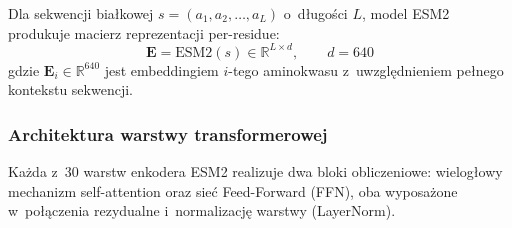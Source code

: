 \documentclass{SGGW-thesis}
\begin{document}
Dla sekwencji białkowej $s = (a_1, a_2, \ldots, a_L)$ o~długości $L$, model ESM2 produkuje macierz
reprezentacji per-residue:
\begin{equation}
    \mathbf{E} = \text{ESM2}(s) \in \mathbb{R}^{L \times d}, \qquad d = 640
    \label{eq:esm2_output}
\end{equation}
gdzie $\mathbf{E}_i \in \mathbb{R}^{640}$ jest embeddingiem $i$-tego aminokwasu z~uwzględnieniem
pełnego kontekstu sekwencji.

\subsubsection*{Architektura warstwy transformerowej}

Każda z~30 warstw enkodera ESM2 realizuje dwa bloki obliczeniowe: wielogłowy mechanizm
self-attention oraz sieć Feed-Forward (FFN), oba wyposażone w~połączenia rezydualne
i~normalizację warstwy (LayerNorm).
\end{document}
